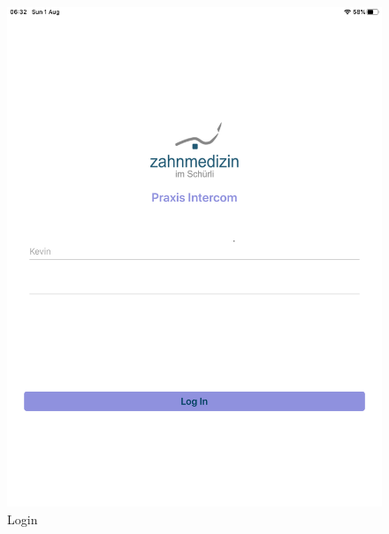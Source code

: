 \begin{figure}[h]
    \centering
    \begin{minipage}[b]{0.4\textwidth}
        \includegraphics[width=\textwidth]{graphics/screenshots/mobileclient/screenshots-login}
        \caption{Login}
    \end{minipage}
    \hfill
    \begin{minipage}[b]{0.4\textwidth}

\end{minipage}
\end{figure}

